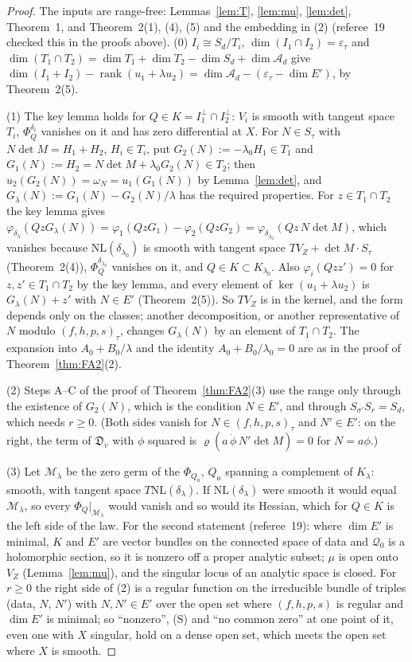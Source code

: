 \documentclass[11pt]{article}
\numberwithin{equation}{section}
\theoremstyle{remark}
\newcommand{\NL}{\mathrm{NL}}
\newcommand{\VZ}{V_Z}
\newcommand{\cM}{\mathcal{M}}
\newcommand{\cA}{\mathcal{A}}
\newcommand{\lz}{\lambda_0}
\newcommand{\et}{\varepsilon_\tau}
\begin{document}
\begin{proof}
The inputs are range-free: Lemmas~\ref{lem:T}, \ref{lem:mu}, \ref{lem:det}, Theorem~1, and Theorem~2(1), (4),
(5) and the embedding in (2) (referee~19 checked this in the proofs above). (0) $I_i\cong S_d/T_i$,
$\dim(I_1\cap I_2)=\et$ and $\dim(T_1\cap T_2)=\dim T_1+\dim T_2-\dim S_d+\dim\cA_d$ give
$\dim(I_1+I_2)-\operatorname{rank}(u_1+\lambda u_2)=\dim\cA_d-(\et-\dim E')$, by Theorem~2(5).

(1) The key lemma holds for $Q\in K=I_1^\perp\cap I_2^\perp$: $V_i$ is smooth with tangent space $T_i$,
$\Phi^{\delta_i}_Q$ vanishes on it and has zero differential at $X$. For $N\in S_\tau$ with
$N\det M=H_1+H_2$, $H_i\in T_i$, put $G_2(N):=-\lz H_1\in T_1$ and $G_1(N):=H_2=N\det M+\lz G_2(N)\in T_2$; then
$u_2(G_2(N))=\omega_N=u_1(G_1(N))$ by Lemma~\ref{lem:det}, and $G_\lambda(N):=G_1(N)-G_2(N)/\lambda$ has the
required properties. For $z\in T_1\cap T_2$ the key lemma gives
$\varphi_{\delta_\lambda}(QzG_\lambda(N))=\varphi_1(QzG_1)-\varphi_2(QzG_2)=\varphi_{\delta_{\lz}}(Qz\,N\det M)$, which
vanishes because $\NL(\delta_{\lz})$ is smooth with tangent space $T\VZ+\det M\cdot S_\tau$ (Theorem~2(4)),
$\Phi^{\delta_{\lz}}_Q$ vanishes on it, and $Q\in K\subset K_{\lz}$. Also $\varphi_i(Qzz')=0$ for
$z,z'\in T_1\cap T_2$ by the key lemma, and every element of $\ker(u_1+\lambda u_2)$ is $G_\lambda(N)+z'$ with
$N\in E'$ (Theorem~2(5)). So $T\VZ$ is in the kernel, and the form
depends only on the classes; another decomposition, or another representative of $N$ modulo $(f,h,p,s)_\tau$,
changes $G_\lambda(N)$ by an element of $T_1\cap T_2$. The expansion into $A_0+B_0/\lambda$ and the identity
$A_0+B_0/\lz=0$ are as in the proof of Theorem~\ref{thm:FA2}(2).

(2) Steps A--C of the proof of Theorem~\ref{thm:FA2}(3) use the range only through the existence of $G_2(N)$,
which is the condition $N\in E'$, and through $S_{\sigma'}S_r=S_d$, which needs $r\ge0$. (Both sides vanish for
$N\in(f,h,p,s)_\tau$ and $N'\in E'$: on the right, the term of $\mathfrak D_{\dot v}$ with $\phi$ squared is
$\varrho(a\,\dot\phi\,N'\det M)=0$ for $N=a\phi$.)

(3) Let $\cM_\lambda$ be the zero germ of the $\Phi_{Q_a}$, $Q_a$ spanning a complement of $K_\lambda$: smooth,
with tangent space $T\NL(\delta_\lambda)$. If $\NL(\delta_\lambda)$ were smooth it would equal $\cM_\lambda$, so
every $\Phi_Q|_{\cM_\lambda}$ would vanish and so would its Hessian, which for $Q\in K$ is the left side of the
law. For the second statement (referee~19): where $\dim E'$ is minimal, $K$ and $E'$ are vector bundles on the
connected space of data and $\mathcal Q_0$ is a holomorphic section, so it is nonzero off a proper analytic
subset; $\mu$ is open onto $\VZ$ (Lemma~\ref{lem:mu}), and the singular locus of an analytic space is closed.
For $r\ge0$ the right side of (2) is a regular function on the irreducible bundle of triples (data, $N$, $N'$)
with $N,N'\in E'$ over the open set where $(f,h,p,s)$ is regular and $\dim E'$ is minimal; so ``nonzero'', (S)
and ``no common zero'' at one point of it, even one with $X$ singular, hold on a dense open set, which meets
the open set where $X$ is smooth.


\end{proof}
\end{document}
